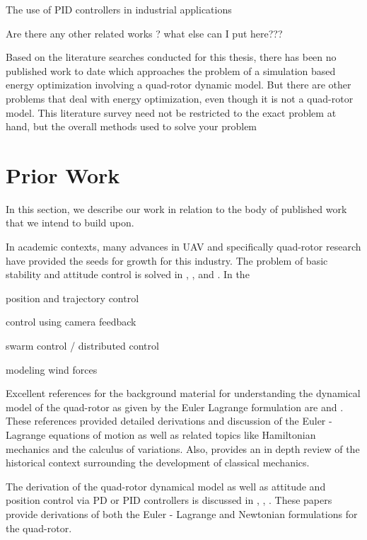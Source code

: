 The use of PID controllers in industrial applications 
\cite{o2006reducing}

{\color{red}Are there any other related works ? what else can I put here??? }

Based on the literature searches conducted for this thesis, there has been no published work to date which approaches the problem of a simulation based energy optimization involving a quad-rotor dynamic model. {\color{green} But there are other problems that deal with energy optimization, even though it is not a quad-rotor model. This literature survey need not be restricted to the exact problem at hand, but the overall methods used to solve your problem}






\section{Prior Work}

In this section, we describe our work in relation to the body of published work that we intend to build upon.


In academic contexts, many advances in UAV and specifically quad-rotor research have provided the seeds for growth for this industry. The problem of basic stability and attitude control is solved in \cite{erginer2007modeling}, \cite{bouabdallah2004pid}, and \cite{Luukkonen}. In the

position and trajectory control

control using camera feedback

swarm control / distributed control

modeling wind forces


Excellent references for the background material for understanding the dynamical model of the quad-rotor as given by the Euler Lagrange formulation are \cite{marion1995classical} and  \cite{cornelius1970variational}. These references provided detailed derivations and discussion of the Euler - Lagrange equations of motion as well as related topics like Hamiltonian mechanics and the calculus of variations. Also, \cite{cornelius1970variational} provides an in depth review of the historical context surrounding the development of classical mechanics. 

The derivation of the quad-rotor dynamical model as well as attitude and position control via PD or PID controllers is discussed in \cite{erginer2007modeling}, \cite{bouabdallah2004pid}, \cite{Luukkonen}. These papers provide derivations of both the Euler - Lagrange and Newtonian formulations for the quad-rotor.


